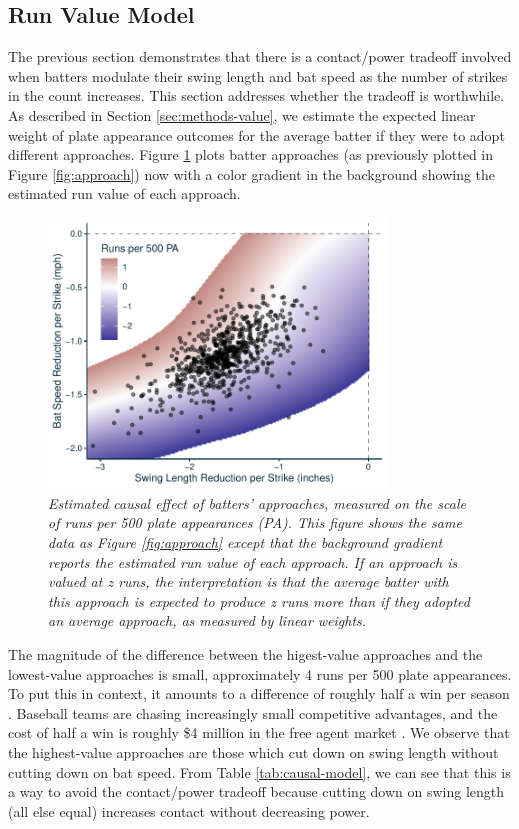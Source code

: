 \documentclass{article}
\begin{document}
    \subsection{Run Value Model}
    \label{sec:results-value}

      The previous section demonstrates that there is a contact/power tradeoff involved when batters modulate their swing length and bat speed as the number of strikes in the count increases. This section addresses whether the tradeoff is worthwhile. As described in Section \ref{sec:methods-value}, we estimate the expected linear weight of plate appearance outcomes for the average batter if they were to adopt different approaches. Figure \ref{fig:approach-run-value} plots batter approaches (as previously plotted in Figure \ref{fig:approach}) now with a color gradient in the background showing the estimated run value of each approach.

      \begin{figure}[H]
        \centering
        \includegraphics[width = 0.8\textwidth]{../../figures/approach_run_value.pdf}
        \caption{\it Estimated causal effect of batters' approaches, measured on the scale of runs per 500 plate appearances (PA). This figure shows the same data as Figure \ref{fig:approach} except that the background gradient reports the estimated run value of each approach. If an approach is valued at z runs, the interpretation is that the average batter with this approach is expected to produce z runs more than if they adopted an average approach, as measured by linear weights.}
        \label{fig:approach-run-value}
      \end{figure}

      The magnitude of the difference between the higest-value approaches and the lowest-value approaches is small, approximately 4 runs per 500 plate appearances. To put this in context, it amounts to a difference of roughly half a win per season \citep{slowinski_converting_2010}. Baseball teams are chasing increasingly small competitive advantages, and the cost of half a win is roughly \$4 million in the free agent market \citep{clemens_what_2021}. We observe that the highest-value approaches are those which cut down on swing length without cutting down on bat speed. From Table \ref{tab:causal-model}, we can see that this is a way to avoid the contact/power tradeoff because cutting down on swing length (all else equal) increases contact without decreasing power.
\end{document}
